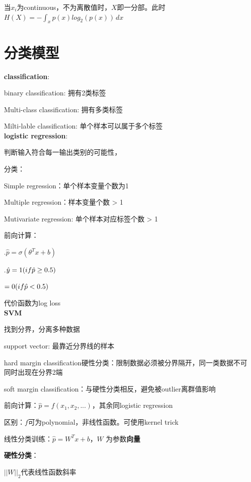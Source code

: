 \documentclass[UTF8]{ctexart}
\begin{document}
  当$x_i$为continuous，不为离散值时，$X$即一分部。此时$H(X) = -\int_{x} p(x)log_2(p(x))\,dx $


\section{分类模型}
\noindent \textbf{classification}:

  binary classification: 拥有2类标签

  Multi-class classification: 拥有多类标签

  Milti-lable classification: 单个样本可以属于多个标签\\
\textbf{logistic regression}:

  判断输入符合每一输出类别的可能性，

  分类：

  \quad Simple regression：单个样本变量个数为1

  \quad Multiple regression：样本变量个数 > 1

  \quad Mutivariate regression: 单个样本对应标签个数 > 1

  前向计算：
  
  .$\hat{p} = \sigma(\theta^Tx + b)$

  .$\hat{y} = 1\space (if \hat{p} \geq 0.5)$

  \quad \quad \quad $= 0\space (if \hat{p} < 0.5)$

  代价函数为log loss\\
\textbf{SVM}

  找到分界，分离多种数据

  support vector: 最靠近分界线的样本

  hard margin classification硬性分类：限制数据必须被分界隔开，同一类数据不可同时出现在分界2端

  soft margin classification：与硬性分类相反，避免被outlier离群值影响

  前向计算：$\hat{p} = f(x_1, x_2,...)$，其余同logistic regression

  \quad 区别：$f$可为polynomial，非线性函数。可使用kernel trick

  线性分类训练：$\hat{p} = W^Tx + b$，$W$ 为参数\textbf{向量}

  \quad \textbf{硬性分类}：

  \quad \quad $||W||_2$代表线性函数斜率
\end{document}
